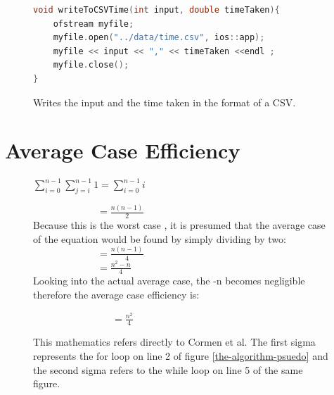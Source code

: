\documentclass[12pt]{article}
\begin{document}
\begin{appendices}
\begin{figure}[h]
\begin{lstlisting}[language=C++, breaklines=true]
void writeToCSVTime(int input, double timeTaken){
	ofstream myfile;
	myfile.open("../data/time.csv", ios::app);
	myfile << input << "," << timeTaken <<endl ;
	myfile.close();
}
\end{lstlisting}
\caption{\label{write-to-csv-time} Writes the input and the time taken in the format of a CSV.}
\end{figure}

\newpage

\section{Average Case Efficiency}

\begin{figure}[h]
\noindent$\sum_{i=0}^{n-1} \sum_{j=i}^{n-1} 1 = \sum_{i=0}^{n-1} i $ \newline

\ \ \ \ \ \ \ \ \ \ \ \ \  $=\frac{n(n-1)}{2}$ \\ 
Because this is the worst case \cite{cormen2009linear}, it is presumed that the average case of the equation would be found by simply dividing by two: \\ 

\ \ \ \ \ \ \ \ \ \ \ \ \  $=\frac{n(n-1)}{4}$ \\ 

\ \ \ \ \ \ \ \ \ \ \ \ \  $=\frac{n^2-n}{4}$ \\ 

Looking into the actual average case, the -n becomes negligible therefore the average case efficiency is: 

\ \ \ \ \ \ \ \ \ \ \ \ \  \ \ \ $=\frac{n^2}{4}$ \\ 
	\caption{\label{average-case}This mathematics refers directly to Cormen et al. \cite[p.26]{cormen2009linear} The first sigma represents the for loop on line 2 of figure \ref{the-algorithm-psuedo} and the second sigma refers to the while loop on line 5 of the same figure.}
\end{figure}

\newpage


\end{appendices}
\end{document}
